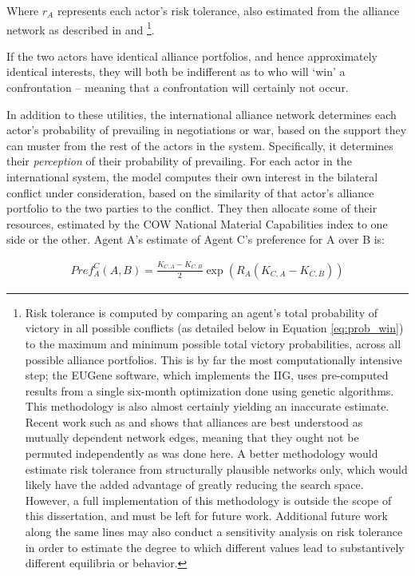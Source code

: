 Where $r_A$ represents each actor's risk tolerance, also estimated from the alliance network as described in \citet{bdm_1985} and \citet{bennett_2000b}\footnote{\label{fn:eugene_risk}Risk tolerance is computed by comparing an agent's total probability of victory in all possible conflicts (as detailed below in Equation \ref{eq:prob_win}) to the maximum and minimum possible total victory probabilities, across all possible alliance portfolios. This is by far the most computationally intensive step; the \citet{bennett_2000b} EUGene software, which implements the IIG, uses pre-computed results from a single six-month optimization done using genetic algorithms. This methodology is also almost certainly yielding an inaccurate estimate. Recent work such as \citet{maoz_2010} and \citet{cranmer_2012b} shows that alliances are best understood as mutually dependent network edges, meaning that they ought not be permuted independently as was done here. A better methodology would estimate risk tolerance from structurally plausible networks only, which would likely have the added advantage of greatly reducing the search space. However, a full implementation of this methodology is outside the scope of this dissertation, and must be left for future work. Additional future work along the same lines may also conduct a sensitivity analysis on risk tolerance in order to estimate the degree to which different values lead to substantively different equilibria or behavior.}.

If the two actors have identical alliance portfolios, and hence approximately identical interests, they will both be indifferent as to who will `win' a confrontation -- meaning that a confrontation will certainly not occur.

In addition to these utilities, the international alliance network determines each actor's probability of prevailing in negotiations or war, based on the support they can muster from the rest of the actors in the system. Specifically, it determines their \emph{perception} of their probability of prevailing. For each actor in the international system, the model computes their own interest in the bilateral conflict under consideration, based on the similarity of that actor's alliance portfolio to the two parties to the conflict. They then allocate some of their resources, estimated by the COW National Material Capabilities index \citep{nmc_2010} to one side or the other. Agent A's estimate of Agent C's preference for A over B is:

\begin{align} 	
	Pref_A^C(A,B)=\frac{K_{C,A}-K_{C,B}}{2}\exp(R_A(K_{C,A}-K_{C,B})) \label{eq:pref_c}
\end{align}

